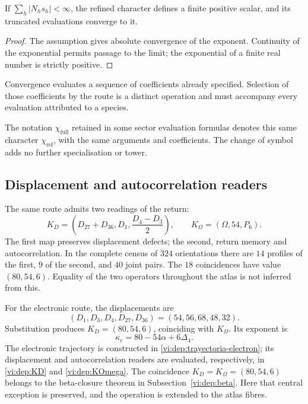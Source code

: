 \begin{proposition}
If \(\sum_h|N_hs_h|<\infty\), the refined character defines a finite
positive scalar, and its truncated evaluations converge to it.
\end{proposition}
\begin{proof}
The assumption gives absolute convergence of the exponent. Continuity of the
exponential permits passage to the limit; the exponential of a finite real number is
strictly positive.
\end{proof}

Convergence evaluates a sequence of coefficients already specified.
Selection of those coefficients by the route is a distinct operation
and must accompany every evaluation attributed to a species.

The notation \(\chi_{\mathrm{full}}\) retained in some sector
evaluation formulas denotes this same character
\(\chi_{\mathrm{ref}}\), with the same arguments and coefficients.
The change of symbol adds no further specialisation or tower.

\subsection{Displacement and autocorrelation readers}

The same route admits two readings of the return:
\[
 K_D=\left(D_{27}+D_{36},D_1,\frac{D_4-D_3}{2}\right),\qquad
 K_\Omega=(\Omega,54,P_6).
\]
The first map preserves displacement defects; the second, return
memory and autocorrelation. In the complete census of \(324\) orientations
there are \(14\) profiles of the first, \(9\) of the second, and \(40\) joint
pairs. The \(18\) coincidences have value \((80,54,6)\).
Equality of the two operators throughout the atlas is not inferred from this.

For the electronic route, the displacements are
\[
 (D_1,D_3,D_4,D_{27},D_{36})=(54,56,68,48,32).
\]
Substitution produces \(K_D=(80,54,6)\), coinciding with
\(K_\Omega\). Its exponent is
\[
 \kappa_e=80-54\alpha+6\Delta_4.
\]
The electronic trajectory is constructed in
\eqref{vi:dep:trayectoria-electron}; its displacement and
autocorrelation readers are evaluated, respectively, in
\eqref{vi:dep:KD} and \eqref{vi:dep:KOmega}. The coincidence
\(K_D=K_\Omega=(80,54,6)\) belongs to the beta-closure theorem in
Subsection~\ref{vi:dep:beta}. Here that central exception is preserved, and the
operation is extended to the atlas fibres.

